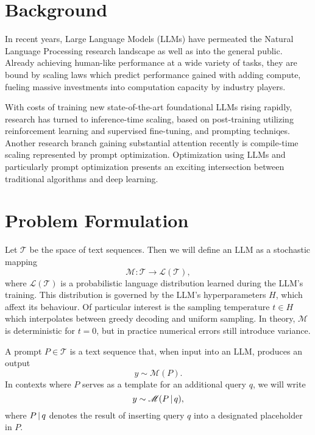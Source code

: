 \section{Background}
In recent years, Large Language Models (LLMs) have permeated the Natural Language Processing research landscape as well as into the general public. 
Already achieving human-like performance at a wide variety of tasks\cite{bubeck2023sparksartificialgeneralintelligence}, 
they are bound by scaling laws\cite{kaplan2020scalinglawsneurallanguage} which predict performance gained with adding compute, fueling
massive investments into computation capacity by industry players. 

With costs of training new state-of-the-art foundational LLMs rising rapidly, research has turned to inference-time scaling\cite{welleck2024decodingmetagenerationinferencetimealgorithms}, 
based on post-training\cite{openai2024openaio1card}\cite{deepseekai2025deepseekr1incentivizingreasoningcapability} utilizing reinforcement learning and supervised fine-tuning, and prompting techniqes\cite{schulhoff2024promptreportsystematicsurvey}.
Another research branch gaining substantial attention recently is compile-time scaling\cite{schnabel2024symbolicpromptprogramsearch} represented by prompt optimization\cite{ramnath2025systematicsurveyautomaticprompt}.
Optimization using LLMs and particularly prompt optimization presents an exciting intersection between traditional algorithms and deep learning.

\section{Problem Formulation}\label{sec:notation}
Let $\mathcal{T}$ be the space of text sequences. Then we will define an LLM as a stochastic mapping
\begin{equation}
    \mathscr{M}: \mathcal{T} \rightarrow \mathcal{L}(\mathcal{T}),
\end{equation}
where $\mathcal{L}(\mathcal{T})$ is a probabilistic language distribution learned during the LLM's training.
This distribution is governed by the LLM's hyperparameters $H$, which affext its behaviour. Of particular interest is
the sampling temperature $t \in H$ which interpolates between greedy decoding and uniform sampling.
In theory, $\mathscr{M}$ is deterministic for $t=0$, but in practice numerical errors still introduce variance.

A prompt $P \in \mathcal{T}$ is a text sequence that, when input into an LLM, produces an output
\begin{equation}
    y \sim \mathscr{M}(P).
\end{equation}
In contexts where $P$ serves as a template for an additional query $q$, we will write
\begin{equation}
    y \sim \mathscr{M}(P\, \vert \, q),
\end{equation}
where $P \, \vert \, q$ denotes the result of inserting query $q$ into a designated placeholder in $P$.


